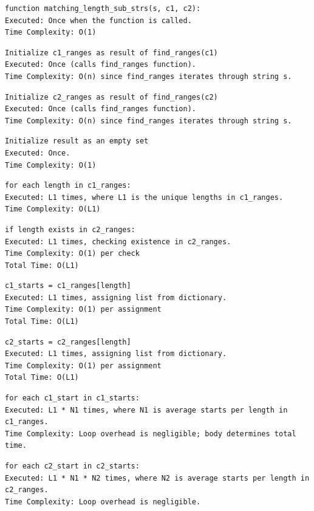 \documentclass[12 pt]{article}
\begin{document}
\begin{verbatim}
function matching_length_sub_strs(s, c1, c2):
Executed: Once when the function is called.
Time Complexity: O(1)
\end{verbatim}

\begin{verbatim}
Initialize c1_ranges as result of find_ranges(c1)
Executed: Once (calls find_ranges function).
Time Complexity: O(n) since find_ranges iterates through string s.
\end{verbatim}

\begin{verbatim}
Initialize c2_ranges as result of find_ranges(c2)
Executed: Once (calls find_ranges function).
Time Complexity: O(n) since find_ranges iterates through string s.
\end{verbatim}

\begin{verbatim}
Initialize result as an empty set
Executed: Once.
Time Complexity: O(1)
\end{verbatim}

\begin{verbatim}
for each length in c1_ranges:
Executed: L1 times, where L1 is the unique lengths in c1_ranges.
Time Complexity: O(L1)
\end{verbatim}

\begin{verbatim}
if length exists in c2_ranges:
Executed: L1 times, checking existence in c2_ranges.
Time Complexity: O(1) per check
Total Time: O(L1)
\end{verbatim}

\begin{verbatim}
c1_starts = c1_ranges[length]
Executed: L1 times, assigning list from dictionary.
Time Complexity: O(1) per assignment
Total Time: O(L1)
\end{verbatim}

\begin{verbatim}
c2_starts = c2_ranges[length]
Executed: L1 times, assigning list from dictionary.
Time Complexity: O(1) per assignment
Total Time: O(L1)
\end{verbatim}

\begin{verbatim}
for each c1_start in c1_starts:
Executed: L1 * N1 times, where N1 is average starts per length in c1_ranges.
Time Complexity: Loop overhead is negligible; body determines total time.
\end{verbatim}

\begin{verbatim}
for each c2_start in c2_starts:
Executed: L1 * N1 * N2 times, where N2 is average starts per length in c2_ranges.
Time Complexity: Loop overhead is negligible.
\end{verbatim}
\end{document}
